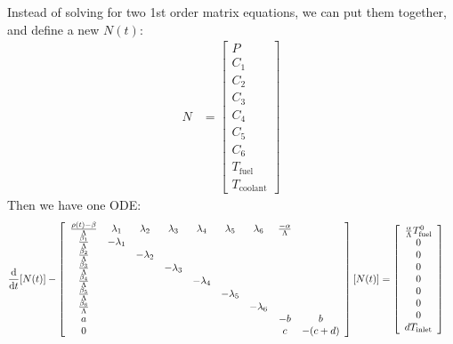 \documentclass{school-22.211-notes}
\begin{document}
 
Instead of solving for two 1st order matrix equations, we can put them together, and define a new $N(t)$: 
\begin{align}
N &= \left[ \begin{array}{c} P \\ C_1 \\ C_2 \\ C_3 \\ C_4 \\ C_5 \\ C_6 \\ T_{\mathrm{fuel}} \\ T_{\mathrm{coolant}} \end{array} \right]  
\end{align}
Then we have one ODE:
\begin{align}
\frac{\mathrm{d}}{\mathrm{d}t} [N(t)] - \left[ \begin{array}{ccccccccc}
\frac{\rho(t) - \beta}{\Lambda} & \lambda_1  & \lambda_2 & \lambda_3 & \lambda_4 & \lambda_5 & \lambda_6 & \frac{-\alpha}{\Lambda} & \\ 
\frac{\beta_1}{\Lambda}         & - \lambda_1 &          &           &           &           &           & &\\
\frac{\beta_2}{\Lambda}         &             & -\lambda_2 &         &           &           &           & &\\
\frac{\beta_3}{\Lambda}         &             &            & -\lambda_3 &        &           &           & &\\
\frac{\beta_4}{\Lambda}         &             &           &          & - \lambda_4 &         &           & &\\
\frac{\beta_5}{\Lambda}         &             &           &          &           & -\lambda_5 &          & &\\
\frac{\beta_6}{\Lambda}         &             &           &          &           &           & - \lambda_6&& \\
a                               &             &           &          &           &           & & -b & b \\
0                               &             &           &          &           &           & & c & -(c+d) \\
\end{array} \right] [N(t)] 
&= 
\left[ \begin{array}{c} \frac{\alpha}{\Lambda} T_{\mathrm{fuel}}^0 \\ 0 \\ 0 \\ 0 \\ 0 \\ 0\\ 0 \\ 0 \\ d T_{\mathrm{inlet}} \end{array} \right]  
\end{align}
\end{document}
